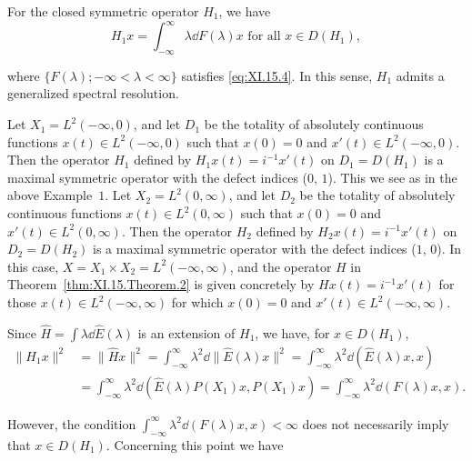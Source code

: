 \begin{remarkn}[Remark $1$] For the closed symmetric operator $H_{1}$, we have 
\[
H _{1} x = \int_{- \infty} ^{\infty} \lambda \dd F (\lambda) x \text{ for all } x \in D (H _{1}),
\]
\end{remarkn}

where $\{F(\lambda);-\infty<\lambda<\infty\}$ satisfies \eqref{eq:XI.15.4}. In this sense, $H_{1}$ admits a generalized spectral resolution. 

\begin{example}\label{ex:XI.15.Example.4} Let $X_{1} = L^{2}(-\infty,0)$, and let $D_{1}$ be the totality of absolutely continuous functions $x(t) \in L^{2}(-\infty,0)$ such that $x(0) = 0$ and $x'(t) \in L^{2}(-\infty,0)$. Then the operator $H_{1}$ defined by $H_{1}x(t) = i^{-1}x'(t)$ on $D_{1} = D(H_{1})$ is a maximal symmetric operator with the defect indices ($0$, $1$). This we see as in the above Example~\hyperref[ex:XI.15.Example.1]{$1$}. Let $X_{2} = L^{2}(0,\infty)$, and let $D_{2}$ be the totality of absolutely continuous functions $x(t) \in L^{2}(0,\infty)$ such that $x(0) = 0$ and $x'(t) \in L^{2}(0,\infty)$. Then the operator $H_{2}$ defined by $H_{2}x(t) = i^{-1}x'(t)$ on $D_{2} = D(H_{2})$ is a maximal symmetric operator with the defect indices ($1$, $0$). In this case, $X = X_{1} \times X_{2} = L^{2}(-\infty,\infty)$, and the operator $H$ in Theorem~\ref{thm:XI.15.Theorem.2} is given concretely by $Hx(t) = i^{-1}x'(t)$ for those $x(t) \in L^{2}(-\infty,\infty)$ for which $x(0) = 0$ and $x'(t) \in L^{2}(-\infty,\infty)$. 
\end{example}

\begin{remarkn}[Remark $2$] Since $\hat{H} = \int \lambda \dd\hat{E} (\lambda)$ is an extension of $H_{1}$, we have, for $x \in D(H_{1})$, 
\begin{equation}\label{eq:XI.15.5}
\begin{aligned} \| H _{1} x \| ^{2} & = \| \hat {H} x \| ^{2} = \int_{- \infty} ^{\infty} \lambda^{2} \dd \| \hat {E} (\lambda) x \| ^{2} = \int_{- \infty} ^{\infty} \lambda^{2} \dd (\hat {E} (\lambda) x, x) \\ & = \int_{- \infty} ^{\infty} \lambda^{2} \dd (\hat {E} (\lambda) P (X _{1}) x, P (X _{1}) x) = \int_{- \infty} ^{\infty} \lambda^{2} \dd (F (\lambda) x, x). \end{aligned}
\end{equation}
\end{remarkn}

However, the condition $\int_{-\infty}^{\infty} \lambda^2 \dd(F(\lambda)x, x) < \infty$ does not necessarily imply that $x \in D(H_1)$. Concerning this point we have 

